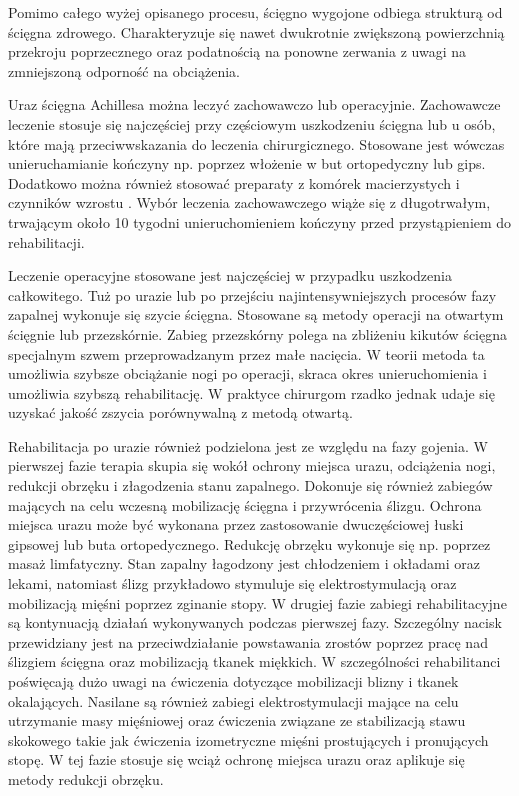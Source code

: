 Pomimo całego wyżej opisanego procesu, ścięgno wygojone odbiega strukturą od ścięgna zdrowego. Charakteryzuje się nawet dwukrotnie zwiększoną powierzchnią przekroju poprzecznego oraz podatnością na ponowne zerwania z uwagi na zmniejszoną odporność na obciążenia. 

Uraz ścięgna Achillesa można leczyć zachowawczo lub operacyjnie. Zachowawcze leczenie stosuje się najczęściej przy częściowym uszkodzeniu ścięgna lub u osób, które mają przeciwwskazania do leczenia chirurgicznego. Stosowane jest wówczas unieruchamianie kończyny np. poprzez włożenie w but ortopedyczny lub gips. Dodatkowo można również stosować preparaty z komórek macierzystych i czynników wzrostu \cite{CMC}. Wybór leczenia zachowawczego wiąże się z długotrwałym, trwającym około 10 tygodni unieruchomieniem kończyny przed przystąpieniem do rehabilitacji.

Leczenie operacyjne stosowane jest najczęściej w przypadku uszkodzenia całkowitego. Tuż po urazie lub po przejściu najintensywniejszych procesów fazy zapalnej wykonuje się szycie ścięgna. Stosowane są metody operacji na otwartym ścięgnie lub przezskórnie. Zabieg przezskórny polega na zbliżeniu kikutów ścięgna specjalnym szwem przeprowadzanym przez małe nacięcia. W teorii metoda ta umożliwia szybsze obciążanie nogi po operacji, skraca okres unieruchomienia i umożliwia szybszą rehabilitację. W praktyce chirurgom rzadko jednak udaje się uzyskać jakość zszycia porównywalną z metodą otwartą. 

Rehabilitacja po urazie również podzielona jest ze względu na fazy gojenia. \linebreak W pierwszej fazie terapia skupia się wokół ochrony miejsca urazu, odciążenia nogi, redukcji obrzęku i złagodzenia stanu zapalnego. Dokonuje się również zabiegów mających na celu wczesną mobilizację ścięgna i przywrócenia ślizgu. Ochrona miejsca urazu może być wykonana przez zastosowanie dwuczęściowej łuski gipsowej lub buta ortopedycznego. Redukcję obrzęku wykonuje się np. poprzez masaż limfatyczny. Stan zapalny łagodzony jest chłodzeniem i okładami oraz lekami, natomiast ślizg przykładowo stymuluje się elektrostymulacją oraz mobilizacją mięśni poprzez zginanie stopy.
\newpage
W drugiej fazie zabiegi rehabilitacyjne są kontynuacją działań wykonywanych podczas pierwszej fazy. Szczególny nacisk przewidziany jest na przeciwdziałanie powstawania zrostów poprzez pracę nad ślizgiem ścięgna oraz mobilizacją tkanek miękkich. W szczególności rehabilitanci poświęcają dużo uwagi na ćwiczenia dotyczące mobilizacji blizny i tkanek okalających. Nasilane są również zabiegi elektrostymulacji mające na celu utrzymanie masy mięśniowej oraz ćwiczenia związane ze stabilizacją stawu skokowego takie jak ćwiczenia izometryczne mięśni prostujących i pronujących stopę. W tej fazie stosuje się wciąż ochronę miejsca urazu oraz aplikuje się metody redukcji obrzęku.

